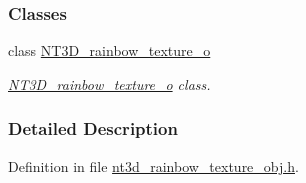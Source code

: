 \subsubsection*{Classes}
\begin{DoxyCompactItemize}
\item 
class \hyperlink{class_n_t3_d__rainbow__texture__o}{NT3D\_\-rainbow\_\-texture\_\-o}
\begin{DoxyCompactList}\small\item\em \hyperlink{class_n_t3_d__rainbow__texture__o}{NT3D\_\-rainbow\_\-texture\_\-o} class. \item\end{DoxyCompactList}\end{DoxyCompactItemize}


\subsubsection{Detailed Description}


Definition in file \hyperlink{nt3d__rainbow__texture__obj_8h_source}{nt3d\_\-rainbow\_\-texture\_\-obj.h}.

